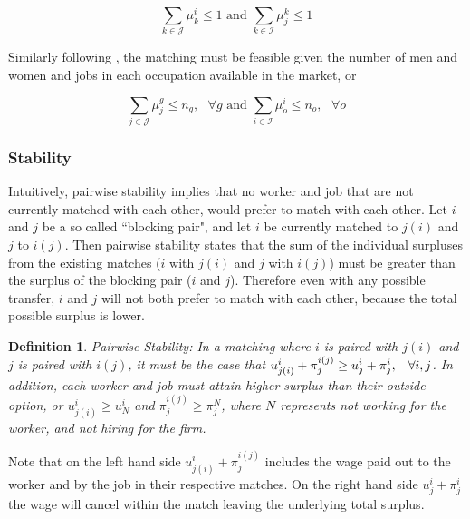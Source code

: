 \documentclass[12pt]{article}
\newtheorem{definition}{Definition}
\begin{document}
$$ \sum_{k \in \mathcal{J}} \mu^i_k \leq 1 \text{ and }  \sum_{k \in \mathcal{I}} \mu^k_j \leq 1$$

Similarly following , the matching must be feasible given the number of men and women and jobs in each occupation available in the market, or

$$ \sum_{j \in \mathcal{J}} \mu^g_j \leq n_g, \text{ } \forall g \text{ and }  \sum_{i \in \mathcal{I}} \mu^i_o \leq n_o, \text{ } \forall o$$

\subsubsection{Stability}

Intuitively, pairwise stability implies that no worker and job that are not currently matched with each other, would prefer to match with each other. Let $i$ and $j$ be a so called ``blocking pair", and let $i$ be currently matched to $j(i)$ and $j$ to $i(j)$. Then pairwise stability states that the sum of the individual surpluses from the existing matches ($i$ with $j(i)$ and $j$ with $i(j)$) must be greater than the surplus of the blocking pair ($i$ and $j$). Therefore even with any possible transfer, $i$ and $j$ will not both prefer to match with each other, because the total possible surplus is lower.

\begin{definition}
Pairwise Stability: In a matching where $i$ is paired with $j(i)$ and $j$ is paired with $i(j)$, it must be the case that $u^{i}_{j(i)}+ \pi^{i(j)}_j \geq u^{i}_{j} + \pi^{i}_j, \hspace{3mm}  \forall i,j$. In addition, each worker and job must attain higher surplus than their outside option, or $u^{i}_{j(i)} \geq u^{i}_{N}$ and $\pi^{i(j)}_j \geq \pi^{N}_j $, where $N$ represents not working for the worker, and not hiring for the firm.
 \end{definition}
 
Note that on the left hand side $u^{i}_{j(i)}+ \pi^{i(j)}_j$ includes the wage paid out to the worker and by the job in their respective matches. On the right hand side $u^{i}_{j} + \pi^{i}_j$ the wage will cancel within the match leaving the underlying total surplus. 

\end{document}
